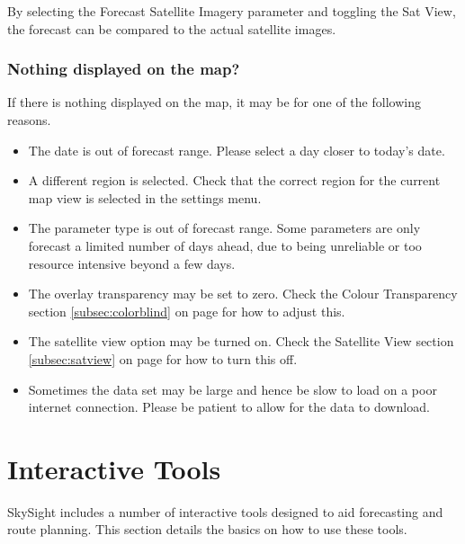 \documentclass[11pt,a4paper]{article}
\begin{document}
\begin{tip}
\item By selecting the Forecast Satellite Imagery parameter and toggling the Sat View, the forecast can be compared to the actual satellite images.
\end{tip}

\subsubsection{Nothing displayed on the map?}
If there is nothing displayed on the map, it may be for one of the following reasons.
\begin{itemize}
\item The date is out of forecast range. Please select a day closer to today's date.
\item A different region is selected. Check that the correct region for the current map view is selected in the settings menu.
\item The parameter type is out of forecast range. Some parameters are only forecast a limited number of days ahead, due to being unreliable or too resource intensive beyond a few days.
\item The overlay transparency may be set to zero. Check the Colour Transparency section \ref{subsec:colorblind} on page \pageref{subsec:colorblind} for how to adjust this.
\item The satellite view option may be turned on. Check the Satellite View section \ref {subsec:satview} on page \pageref{subsec:satview} for how to turn this off.
\item Sometimes the data set may be large and hence be slow to load on a poor internet connection. Please be patient to allow for the data to download.
\end{itemize}

\section{Interactive Tools}
SkySight includes a number of interactive tools designed to aid forecasting and route planning. This section details the basics on how to use these tools.
\end{document}
